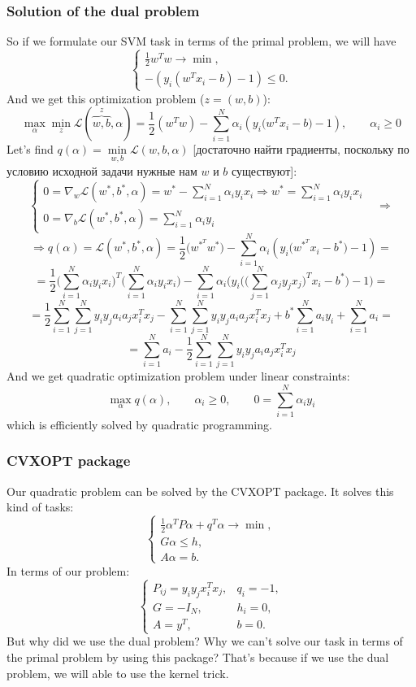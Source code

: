 \subsubsection*{Solution of the dual problem}

So if we formulate our SVM task in terms of the primal problem, we will have
$$\begin{cases}
	\frac{1}{2}w^Tw\to\min, \\
	-(y_i(w^Tx_i-b)-1)\le0.
\end{cases}$$
And we get this optimization problem ($z=(w,b)$):
$$\max\limits_{\alpha}\min\limits_{z}\mathcal{L}(\overbrace{w,b}^z,\alpha)=\frac{1}{2}(w^Tw)-\sum\limits_{i=1}^{N}\alpha_i(y_i\big(w^Tx_i-b\big)-1),\qquad\alpha_i\ge0$$
Let's find $q(\alpha)=\min\limits_{w,b}\mathcal{L}(w,b,\alpha)$ [достаточно найти градиенты, поскольку по условию исходной задачи нужные нам $w$ и $b$ существуют]:
$$\begin{cases}
	0=\nabla_w\mathcal{L}(w^*,b^*,\alpha)=w^*-\sum\limits_{i=1}^{N}\alpha_iy_ix_i\Rightarrow w^*=\sum\limits_{i=1}^{N}\alpha_iy_ix_i &  \\
	0=\nabla_b\mathcal{L}(w^*,b^*,\alpha)=\sum\limits_{i=1}^{N}\alpha_iy_i & 
\end{cases}\Longrightarrow$$
$$\Longrightarrow q(\alpha)=\mathcal{L}(w^*,b^*,\alpha)=\frac{1}{2}\big(w^{*^T}w^*\big)-\sum\limits_{i=1}^{N}\alpha_i(y_i\big(w^{*^T}x_i-b^*\big)-1)=$$
$$=\frac{1}{2}\Big(\sum\limits_{i=1}^{N}\alpha_iy_ix_i\Big)^T\Big(\sum\limits_{i=1}^{N}\alpha_iy_ix_i\Big)-\sum\limits_{i=1}^{N}\alpha_i\big(y_i\Big(\Big(\sum\limits_{j=1}^{N}\alpha_jy_jx_j\Big)^Tx_i-b^*\Big)-1\big)=$$
$$=\frac{1}{2}\sum\limits_{i=1}^{N}\sum\limits_{j=1}^{N}y_iy_ja_ia_jx_i^Tx_j-\sum\limits_{i=1}^{N}\sum\limits_{j=1}^{N}y_iy_ja_ia_jx_i^Tx_j+b^*\sum\limits_{i=1}^{N}a_iy_i+\sum\limits_{i=1}^{N}a_i=$$
$$=\sum\limits_{i=1}^{N}a_i-\frac{1}{2}\sum\limits_{i=1}^{N}\sum\limits_{j=1}^{N}y_iy_ja_ia_jx_i^Tx_j$$
And we get quadratic optimization problem under linear constraints:
$$\max\limits_{\alpha}q(\alpha),\qquad\alpha_i\ge0,\qquad 0=\sum\limits_{i=1}^{N}\alpha_iy_i$$
which is efficiently solved by quadratic programming.

\subsubsection*{CVXOPT package}

Our quadratic problem can be solved by the CVXOPT package. It solves this kind of tasks:
$$\begin{cases}
	\frac{1}{2}\alpha^TP\alpha+q^T\alpha\to\min,\\
	G\alpha\le h, \\
	A\alpha=b.
\end{cases}$$
In terms of our problem:
$$\begin{cases}
	P_{ij}=y_iy_jx_i^Tx_j, & q_i=-1, \\
	G=-I_N, & h_i = 0, \\
	A=y^T, & b = 0.
\end{cases}$$
But why did we use the dual problem? Why we can't solve our task in terms of the primal problem by using this package? That's because if we use the dual problem, we will able to use the kernel trick.

